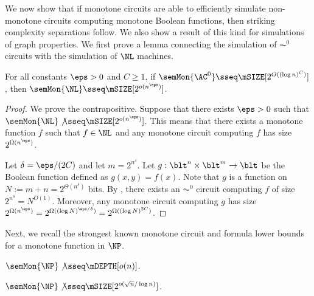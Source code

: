 \documentclass[11pt]{article}
\begin{document}
We now show that if monotone circuits are able to
efficiently simulate non-monotone circuits computing monotone Boolean
functions,
then striking complexity separations follow.
We also show a result of this kind for simulations of graph properties.
We first prove a lemma connecting the simulation of $\AC^0$ circuits
with the simulation of $\NL$ machines.

\begin{lemma}
    \label{thm:nc1-ac0-size}
    For all constants $\eps > 0$ and $C \geq 1$, 
    if 
    $\semMon{\AC^0} 
    \sseq \mSIZE[2^{O((\log n)^C)}]$, 
    then
    $\semMon{\NL} \sseq \mSIZE[2^{o(n^\eps)}]$.
\end{lemma}
\begin{proof}
    We prove the contrapositive.
    Suppose that there exists $\eps > 0$
    such that
    $\semMon{\NL} \not\sseq \mSIZE[2^{o(n^\eps)}]$.
    This means that there exists a monotone function $f$
    such that 
    $f \in \NL$
    and any monotone circuit computing $f$ has size $2^{\Omega(n^\eps)}$.

    Let $\delta = \eps/(2C)$ and let $m = 2^{n^{\delta}}$.
    Let $g : \blt^{n} \times \blt^{m} \to \blt$
    be the Boolean function defined as
    $g(x,y) = f(x)$.
    Note that $g$ is a function on $N := m + n = 2^{\Theta(n^{\delta})}$
    bits.
    By ,
    there exists an $\AC^0$ circuit computing
    $f$ of size 
    $2^{n^\delta} = N^{O(1)}$.
    Moreover, any monotone circuit computing $g$
    has size
    $2^{\Omega(n^\eps)} = 2^{\Omega((\log N)^{\eps / \delta})} =
    2^{\Omega((\log N)^{2C})}$.
\end{proof}




Next, we recall the strongest known monotone circuit 
and formula
lower 
bounds
for a
monotone function in $\NP$. 

\begin{theorem}
    \label{thm:pr17-fnp}
     $\semMon{\NP} \not\sseq \mDEPTH[o(n)]$.
\end{theorem}

\begin{theorem}
    \label{thm:ckr20}
     
    $\semMon{\NP} \not\sseq \mSIZE[2^{o(\sqrt{n}/\log n)}]$.
\end{theorem}
\end{document}
